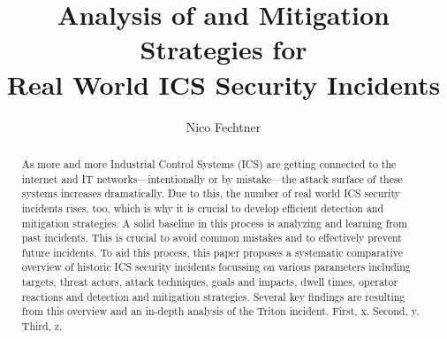 \documentclass[runningheads]{llncs}
\begin{document}
%
\title{Analysis of and Mitigation Strategies for \\Real World ICS Security Incidents}
%
%
\author{Nico Fechtner}
%
%
%
\maketitle              %
%
\begin{abstract}
As more and more Industrial Control Systems (ICS) are getting connected to the internet and IT networks---intentionally or by mistake---the attack surface of these systems increases dramatically.
Due to this, the number of real world ICS security incidents rises, too, which is why it is crucial to develop efficient detection and mitigation strategies.
A solid baseline in this process is analyzing and learning from past incidents.
This is crucial to avoid common mistakes and to effectively prevent future incidents.
To aid this process, this paper proposes a systematic comparative overview of historic ICS security incidents focussing on various parameters including targets, threat actors, attack techniques, goals and impacts, dwell times, operator reactions and detection and mitigation strategies.
Several key findings are resulting from this overview and an in-depth analysis of the Triton incident.
First, x.
Second, y.
Third, z.

\end{abstract}
%
%
%
\end{document}
